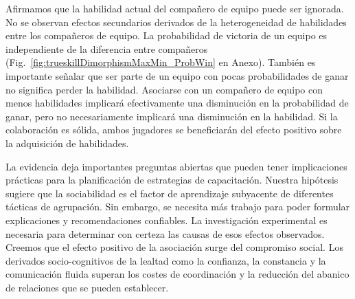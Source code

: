 \documentclass[a4paper,11pt]{book}
\theoremstyle{definition}
\begin{document}

Afirmamos que la habilidad actual del compa\~nero de equipo puede ser ignorada.
%
No se observan efectos secundarios derivados de la heterogeneidad de habilidades entre los compa\~neros de equipo.
%
La probabilidad de victoria de un equipo es independiente de la diferencia entre compa\~neros (Fig.~\ref{fig:trueskillDimorphismMaxMin_ProbWin} en Anexo).
%
Tambi\'en es importante se\~nalar que ser parte de un equipo con pocas probabilidades de ganar no significa perder la habilidad.
%
Asociarse con un compa\~nero de equipo con menos habilidades implicar\'a efectivamente una disminuci\'on en la probabilidad de ganar, pero no necesariamente implicar\'a una disminuci\'on en la habilidad.
%
Si la colaboraci\'on es s\'olida, ambos jugadores se beneficiar\'an del efecto positivo sobre la adquisici\'on de habilidades.


La evidencia deja importantes preguntas abiertas que pueden tener implicaciones pr\'acticas para la planificaci\'on de estrategias de capacitaci\'on.
%
Nuestra hip\'otesis sugiere que la sociabilidad es el factor de aprendizaje subyacente de diferentes t\'acticas de agrupaci\'on.
%
Sin embargo, se necesita m\'as trabajo para poder formular explicaciones y recomendaciones confiables.
%
La investigaci\'on experimental es necesaria para determinar con certeza las causas de esos efectos observados.
%
Creemos que el efecto positivo de la asociaci\'on surge del compromiso social.
%
Los derivados socio-cognitivos de la lealtad como la confianza, la constancia y la comunicaci\'on fluida superan los costes de coordinaci\'on y la reducci\'on del abanico de relaciones que se pueden establecer.
\end{document}
